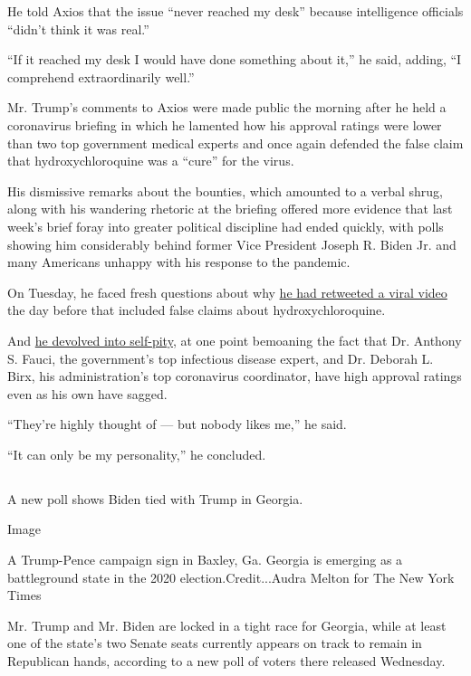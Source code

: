 He told Axios that the issue ``never reached my desk'' because
intelligence officials ``didn't think it was real.''

``If it reached my desk I would have done something about it,'' he said,
adding, ``I comprehend extraordinarily well.''

Mr. Trump's comments to Axios were made public the morning after he held
a coronavirus briefing in which he lamented how his approval ratings
were lower than two top government medical experts and once again
defended the false claim that hydroxychloroquine was a ``cure'' for the
virus.

His dismissive remarks about the bounties, which amounted to a verbal
shrug, along with his wandering rhetoric at the briefing offered more
evidence that last week's brief foray into greater political discipline
had ended quickly, with polls showing him considerably behind former
Vice President Joseph R. Biden Jr. and many Americans unhappy with his
response to the pandemic.

On Tuesday, he faced fresh questions about why
\href{https://www.nytimes3xbfgragh.onion/2020/07/28/technology/virus-video-trump.html}{he
had retweeted a viral video} the day before that included false claims
about hydroxychloroquine.

And
\href{https://www.nytimes3xbfgragh.onion/2020/07/28/us/politics/trump-nobody-likes-me-walks-out-briefing.html}{he
devolved into self-pity}, at one point bemoaning the fact that Dr.
Anthony S. Fauci, the government's top infectious disease expert, and
Dr. Deborah L. Birx, his administration's top coronavirus coordinator,
have high approval ratings even as his own have sagged.

``They're highly thought of --- but nobody likes me,'' he said.

``It can only be my personality,'' he concluded.

\hypertarget{-1}{%
\subsection{}\label{-1}}

A new poll shows Biden tied with Trump in Georgia.

Image

A Trump-Pence campaign sign in Baxley, Ga. Georgia is emerging as a
battleground state in the 2020 election.Credit...Audra Melton for The
New York Times

Mr. Trump and Mr. Biden are locked in a tight race for Georgia, while at
least one of the state's two Senate seats currently appears on track to
remain in Republican hands, according to a new poll of voters there
released Wednesday.

